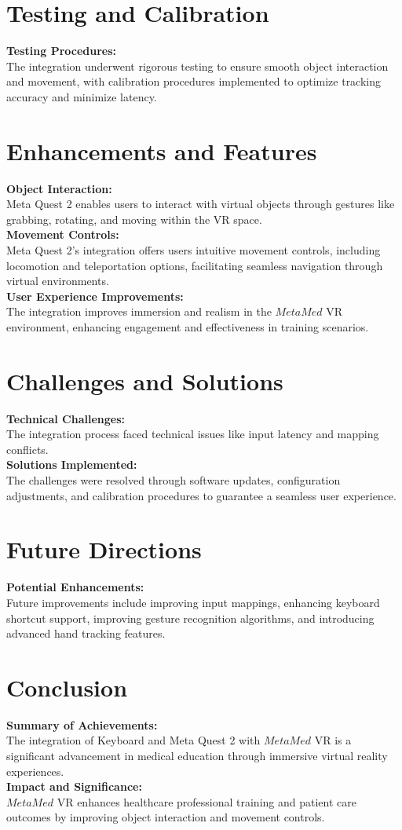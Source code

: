 \section{Testing and Calibration}
\textbf{Testing Procedures:}\\
The integration underwent rigorous testing to ensure smooth object interaction and movement, with calibration procedures implemented to optimize tracking accuracy and minimize latency.
\section{Enhancements and Features}
\textbf{Object Interaction:}\\
Meta Quest 2 enables users to interact with virtual objects through gestures like grabbing, rotating, and moving within the VR space.\\
\textbf{Movement Controls:}\\
Meta Quest 2's integration offers users intuitive movement controls, including locomotion and teleportation options, facilitating seamless navigation through virtual environments.\\
\textbf{User Experience Improvements:}\\
The integration improves immersion and realism in the $MetaMed$ VR environment, enhancing engagement and effectiveness in training scenarios.
\section{Challenges and Solutions}
\textbf{Technical Challenges:}\\
The integration process faced technical issues like input latency and mapping conflicts.\\
\textbf{Solutions Implemented:}\\
The challenges were resolved through software updates, configuration adjustments, and calibration procedures to guarantee a seamless user experience.
\section{Future Directions}
\textbf{Potential Enhancements:}\\
Future improvements include improving input mappings, enhancing keyboard shortcut support, improving gesture recognition algorithms, and introducing advanced hand tracking features.
\section{Conclusion}
\textbf{Summary of Achievements:}\\
The integration of Keyboard and Meta Quest 2 with $MetaMed$ VR is a significant advancement in medical education through immersive virtual reality experiences.\\
\textbf{Impact and Significance:}\\
$MetaMed$ VR enhances healthcare professional training and patient care outcomes by improving object interaction and movement controls.\\
